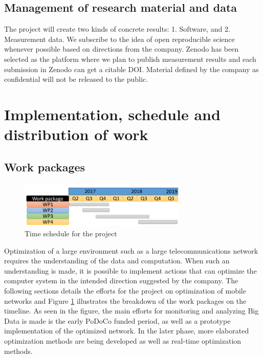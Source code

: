 \documentclass{article}
\begin{document}
\subsection{Management of research material and data}
The project will create two kinds of concrete results: 1. Software, and 2. Measurement data. 
We subscribe to the idea of open reproducible science whenever possible based on directions from the company. 
Zenodo has been selected as the platform where we plan to publish measurement results and each submission in Zenodo can get a citable DOI.
Material defined by the company as confidential will not be released to the public.

\section{Implementation, schedule and distribution of work}
\label{sec:implementation}
\subsection{Work packages}
\begin{figure}
     \vspace{-1.0cm}
    \includegraphics[width=8.0cm]{fig/Timeschedule.pdf}
    \caption{Time schedule for the project}
    \label{fig:schedule}
\end{figure}
Optimization of a large environment such as a large telecommunications network requires the understanding of the data and computation.
When such an understanding is made, it is possible to implement actions that can optimize the computer system in the intended direction suggested by the company.
The following sections details the efforts for the project on optimization of mobile networks and Figure \ref{fig:schedule} illustrates the breakdown of the work packages on the timeline.
As seen in the figure, the main efforts for monitoring and analyzing Big Data is made is the early PoDoCo funded period, as well as a prototype implementation of the optimized network.
In the later phase, more elaborated optimization methods are being developed as well as real-time optimization methods.
\end{document}
